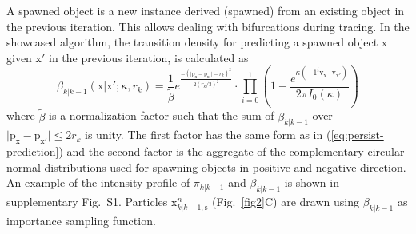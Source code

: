 A spawned object is a new instance derived (spawned) from an existing object in the previous iteration. This allows dealing with bifurcations during tracing. In the showcased algorithm, the transition density for predicting a spawned object $\mathrm{x}$ given $\mathrm{x'}$ in the previous iteration, is calculated as
\begin{equation}
\label{eq:spawn-prediction}
\beta_{k|k-1}(\mathrm{x}|\mathrm{x'}; \kappa, r_k) = \frac{1}{\tilde{\beta}} e^{\frac{-(\vert \mathrm{p}_{\mathrm{x}} - \mathrm{p}_{\mathrm{x'}} \vert-r_k)^2}{2(r_k/3)^2}} \cdot \prod\limits_{i=0}^{1} \left( 1 - \frac{e^{\kappa (-1^i \mathrm{v}_{\mathrm{x}} \cdot \mathrm{v}_{\mathrm{x'}})}}{2 \pi I_0(\kappa)} \right)
\end{equation}
where $\tilde{\beta}$ is a normalization factor such that the sum of $\beta_{k|k-1}$ over $\vert \mathrm{p}_{\mathrm{x}} - \mathrm{p}_{\mathrm{x'}} \vert \leq 2r_k$ is unity. The first factor has the same form as in (\ref{eq:persist-prediction}) and the second factor is the aggregate of the complementary circular normal distributions used for spawning objects in positive and negative direction. An example of the intensity profile of $\pi_{k|k-1}$ and $\beta_{k|k-1}$ is shown in supplementary Fig.~S1. Particles $\mathrm{x}_{k|k-1,\mathrm{s}}^{n}$ (Fig.~\ref{fig2}C) are drawn using $\beta_{k|k-1}$ as importance sampling function.
